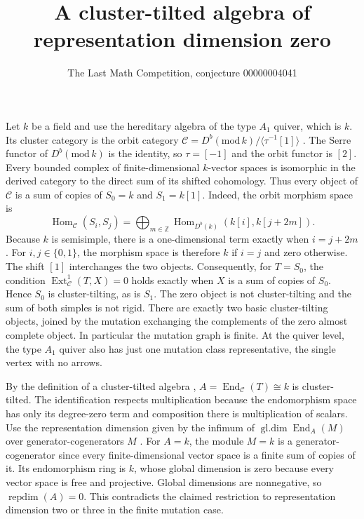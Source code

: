 \documentclass[11pt]{article}
\title{A cluster-tilted algebra of representation dimension zero}
\author{The Last Math Competition, conjecture 00000004041}
\date{}
\begin{document}
\maketitle

Let \(k\) be a field and use the hereditary algebra of the type \(A_1\)
quiver, which is \(k\). Its cluster category is the orbit category
\(\mathcal C=D^b(\mathrm{mod}\,k)/\langle\tau^{-1}[1]\rangle\)
\cite{bmrtt,bmr}. The Serre functor of \(D^b(\mathrm{mod}\,k)\) is the
identity, so \(\tau=[-1]\) and the orbit functor is \([2]\). Every bounded
complex of finite-dimensional \(k\)-vector spaces is isomorphic in the
derived category to the direct sum of its shifted cohomology. Thus every
object of \(\mathcal C\) is a sum of copies of \(S_0=k\) and \(S_1=k[1]\).
Indeed, the orbit morphism space is
\[
  \operatorname{Hom}_{\mathcal C}(S_i,S_j)
   =\bigoplus_{m\in\mathbb Z}\operatorname{Hom}_{D^b(k)}(k[i],k[j+2m]) .
\]
Because \(k\) is semisimple, there is a one-dimensional term exactly when
\(i=j+2m\). For \(i,j\in\{0,1\}\), the morphism space is therefore \(k\) if
\(i=j\) and zero otherwise. The shift \([1]\) interchanges the two objects.
Consequently, for \(T=S_0\), the condition
\(\operatorname{Ext}^1_{\mathcal C}(T,X)=0\) holds exactly when \(X\) is a
sum of copies of \(S_0\). Hence \(S_0\) is cluster-tilting, as is \(S_1\).
The zero object is not cluster-tilting and the sum of both simples is not
rigid. There are exactly two basic cluster-tilting objects, joined by the
mutation exchanging the complements of the zero almost complete object.
In particular the mutation graph is finite. At the quiver level, the
type \(A_1\) quiver also has just one mutation class representative, the
single vertex with no arrows.

By the definition of a cluster-tilted algebra \cite{bmr},
\(A=\operatorname{End}_{\mathcal C}(T)\cong k\) is cluster-tilted. The
identification respects multiplication because the endomorphism space
has only its degree-zero term and composition there is multiplication
of scalars. Use the representation dimension given by the infimum of
\(\operatorname{gl.dim}\operatorname{End}_A(M)\) over generator-cogenerators
\(M\) \cite{xi}. For \(A=k\), the module \(M=k\) is a
generator-cogenerator since every finite-dimensional vector space is a
finite sum of copies of it. Its endomorphism ring is \(k\), whose global
dimension is zero because every vector space is free and projective.
Global dimensions are nonnegative, so \(\operatorname{repdim}(A)=0\).
This contradicts the claimed restriction to representation dimension
two or three in the finite mutation case.
\end{document}
